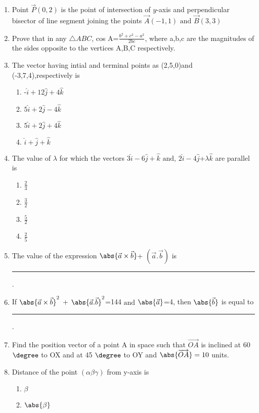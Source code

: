 \begin{enumerate}[label=\thesection.\arabic*,ref=\thesection.\theenumi]

\item  Point $\vec{P}(0,2)$ is the point of intersection of $y$-axis and perpendicular bisector of line segment joining the points $\vec{A}(-1,1) \text{ and } \vec{B}(3,3)$
\item Prove that in any $\triangle{ABC}$, cos A=$\frac{b^2+c^2-a^2}{2bc}$, where a,b,c are the magnitudes of the sides opposite to the vertices A,B,C respectively.
\item The vector having intial and terminal points as (2,5,0)and (-3,7,4),respectively is
	\begin{enumerate}
\item -$\hat{i}+12\hat{j}+4\hat{k}$
\item $5\hat{i}+2\hat{j}-4\hat{k}$
\item $5\hat{i}+2\hat{j}+4\hat{k}$
\item $\hat{i}+\hat{j}+\hat{k}$
\end{enumerate}
\item The value of $\lambda$ for which the vectors $3\hat{i}-6\hat{j}+\hat{k}$ $\text{and}$,  $2\hat{i}-4\hat{j}$+$\lambda\hat{k}$ are parallel is
	\begin{enumerate}
\item $\frac{2}{3}$
\item $\frac{3}{2}$
\item $\frac{5}{2}$
\item $\frac{2}{5}$
	\end{enumerate}	
\item The value of the expression $\abs{\vec{a}\times\vec{b}}$+ $({\vec{a}.\vec{b}})$ is \rule{1cm}{0.15mm}.
\item If $\abs{\vec{a}\times\vec{b}}^2$ + $\abs{\vec{a}.\vec{b}}^2$=144 $\text{and}$  $\abs{\vec{a}}$=4, then $\abs{\vec{b}}$ is equal to \rule{1cm}{0.15mm}.
\item  Find the position vector of a point A in space such that $\overrightarrow{OA}$ is inclined at 60 $\degree$ to OX and at 45 $\degree$ to OY and $\abs{\overrightarrow{OA}} =10$ units.
\item Distance of the point $(\alpha \beta \gamma)$ from y-axis is
\begin{enumerate}
	\item $\beta$ 
	\item $\abs{\beta}$

\end{enumerate}
\end{enumerate}
